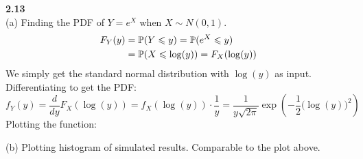 \newpage\noindent
\textbf{2.13}\\  %
(a) Finding the PDF of $Y = e^X$ when $X\sim N(0,1)$.
\begin{align*}
    F_Y(y) &= \P(Y\leq y) = \P(e^X \leq y) \\
    &= \P(X\leq \log(y)) = F_X(\log(y))
\end{align*}
We simply get the standard normal distribution with $\log(y)$ as input.
Differentiating to get the PDF:
$$
f_Y(y) = 
\frac{d}{dy} F_X(\log(y)) = f_X(\log(y))\cdot \frac{1}{y}= 
\frac{1}{y\sqrt{2\pi}}\exp\left(-\frac{1}{2}\big(\log(y)\big)^2\right)
$$
Plotting the function:
\begin{figure}[H]
\begin{minipage}{0.5\textwidth}
\end{minipage}
\begin{minipage}{0.5\textwidth}
\end{minipage}
\end{figure}
(b) Plotting histogram of simulated results. Comparable to the plot above.
